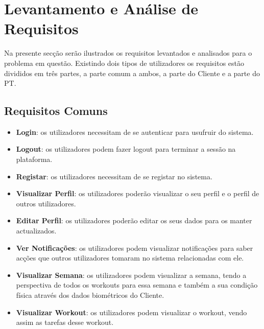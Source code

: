 \chapter{Levantamento e Análise de Requisitos}
\label{chap:requisitos}

\hspace{5mm} Na presente secção serão ilustrados os requisitos levantados e analisados para o problema em questão. Existindo dois tipos de utilizadores os requisitos estão divididos em três partes, a parte comum a ambos, a parte do Cliente e a parte do PT.

\section{Requisitos Comuns}
\label{sec:requisitoscomuns}

\begin{itemize}
    \item \textbf{Login}: os utilizadores necessitam de se autenticar para usufruir do sistema.
    
    \item \textbf{Logout}: os utilizadores podem fazer logout para terminar a sessão na plataforma.
    
    \item \textbf{Registar}: os utilizadores necessitam de se registar no sistema.
    
    \item \textbf{Visualizar Perfil}: os utilizadores poderão visualizar o seu perfil e o perfil de outros utilizadores.
    
    \item \textbf{Editar Perfil}: os utilizadores poderão editar os seus dados para os manter actualizados.
    
    \item \textbf{Ver Notificações}: os utilizadores podem visualizar  notificações para saber acções que outros utilizadores tomaram no sistema relacionadas com ele.
    
    \item \textbf{Visualizar Semana}: os utilizadores podem visualizar a semana, tendo a perspectiva de todos os workouts para essa semana e também a sua condição física através dos dados biométricos do Cliente.
    
    \item \textbf{Visualizar Workout}: os utilizadores podem visualizar o workout, vendo assim as tarefas desse workout.
    
\end{itemize}

